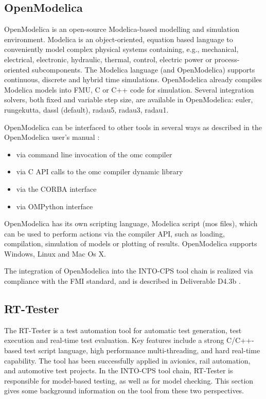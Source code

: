 \subsection{OpenModelica}
OpenModelica \cite{Fritzson04} is an open-source Modelica-based modelling and simulation environment.
%
Modelica \cite{Fritzson&98} is an object-oriented, equation based language to conveniently model complex physical systems containing, e.g., mechanical, electrical, electronic, hydraulic, thermal, control, electric power or process-oriented subcomponents. The Modelica language (and OpenModelica) supports continuous, discrete and hybrid time simulations.
%
OpenModelica already compiles Modelica models into  FMU, C or C++ code for simulation.
%
Several integration solvers, both fixed and variable step size, are available in OpenModelica: euler, rungekutta, dassl (default), radau5, radau3, radau1.

OpenModelica can be interfaced to other tools in several ways as described in the OpenModelica user's manual \cite{OpenModelicaUG15}:
%
%
%
\begin{itemize}
%
\item via command line invocation of the omc compiler
%
\item via C API calls to the omc compiler dynamic library
%
\item via the CORBA interface
%
\item via OMPython interface \cite{Ganeson&12}
%
\end{itemize}
%
%
%
OpenModelica has its own scripting language, Modelica script (mos files), which can be used to perform actions via the compiler API, such as loading, compilation, simulation of models or plotting of results.
%
OpenModelica supports Windows, Linux and Mac Os X.

The integration of OpenModelica into the INTO-CPS tool chain is realized via compliance with the FMI standard, and is described in Deliverable D4.3b \cite{INTOCPSD4.3b}.
%
%
%
\subsection{RT-Tester}
The RT-Tester \cite{VSI-rtt-man} is a test automation tool for automatic
test generation, test 
execution and real-time test evaluation. Key features include a strong
C/C++-based test script language, high performance multi-threading, and
hard real-time capability.
The tool has been successfully applied in avionics, rail automation, and
automotive test projects.
%
In the INTO-CPS tool chain, RT-Tester is responsible for model-based testing, as well as for model checking.
%
This section gives some background information on the tool from these two perspectives.
%
%
%
